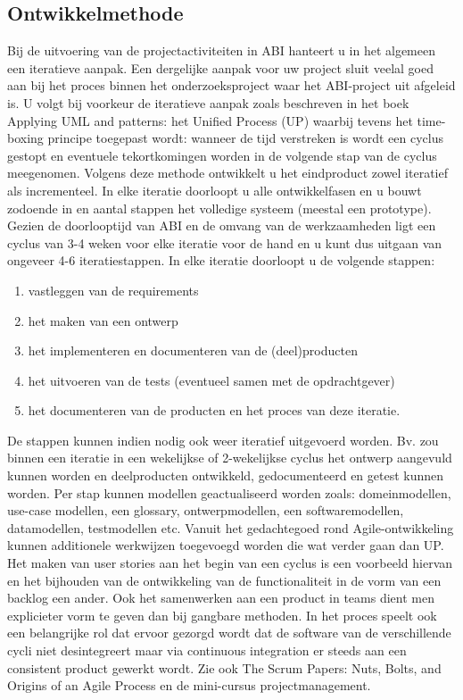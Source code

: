 \subsection{Ontwikkelmethode}
    Bij de uitvoering van de projectactiviteiten in ABI hanteert u in het
algemeen een iteratieve aanpak. Een dergelijke aanpak voor uw project sluit
veelal goed aan bij het proces binnen het onderzoeksproject waar het ABI-project
uit afgeleid is.
    U volgt bij voorkeur de iteratieve aanpak zoals beschreven in het boek
Applying UML and patterns: het Unified Process (UP) waarbij tevens het
time-boxing principe toegepast wordt: wanneer de tijd verstreken is wordt een
cyclus gestopt en eventuele tekortkomingen worden in de volgende stap van de
cyclus meegenomen.
    Volgens deze methode ontwikkelt u het eindproduct zowel iteratief als
incrementeel. In elke iteratie doorloopt u alle ontwikkelfasen en u bouwt
zodoende in en aantal stappen het volledige systeem (meestal een prototype).
    Gezien de doorlooptijd van ABI en de omvang van de werkzaamheden ligt een
cyclus van 3-4 weken voor elke iteratie voor de hand en u kunt dus uitgaan van
ongeveer 4-6 iteratiestappen.
    In elke iteratie doorloopt u de volgende stappen:
    \begin{enumerate}
        \item vastleggen van de requirements
        \item het maken van een ontwerp
        \item het implementeren en documenteren van de (deel)producten
        \item het uitvoeren van de tests (eventueel samen met de opdrachtgever)
        \item het documenteren van de producten en het proces van deze iteratie.
    \end{enumerate}

    De stappen kunnen indien nodig ook weer iteratief uitgevoerd worden. Bv. zou
binnen een iteratie in een wekelijkse of 2-wekelijkse cyclus het ontwerp
aangevuld kunnen worden en deelproducten ontwikkeld, gedocumenteerd en getest
kunnen worden.
    Per stap kunnen modellen geactualiseerd worden zoals: domeinmodellen,
use-case modellen, een glossary, ontwerpmodellen, een softwaremodellen,
datamodellen, testmodellen etc.
    Vanuit het gedachtegoed rond Agile-ontwikkeling kunnen additionele
werkwijzen toegevoegd worden die wat verder gaan dan UP. Het maken van user
stories aan het begin van een cyclus is een voorbeeld hiervan en het bijhouden
van de ontwikkeling van de functionaliteit in de vorm van een backlog een ander.
Ook het samenwerken aan een product in teams dient men explicieter vorm te geven
dan bij gangbare methoden. In het proces speelt ook een belangrijke rol dat
ervoor gezorgd wordt dat de software van de verschillende cycli niet
desintegreert maar via continuous integration er steeds aan een consistent
product gewerkt wordt. Zie ook The Scrum Papers: Nuts, Bolts, and Origins of an
Agile Process en de mini-cursus projectmanagement.

